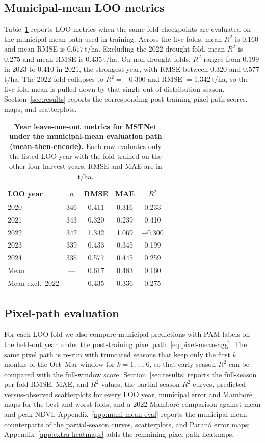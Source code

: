 \subsection{Municipal-mean LOO metrics}
\label{sec:exp-muni-mean}
Table~\ref{tab:loo-muni-mean} reports LOO metrics when the same fold checkpoints are evaluated on the municipal-mean path used in training.
Across the five folds, mean $R^2$ is $0.160$ and mean RMSE is $0.617$\,\si{t/ha}.
Excluding the 2022 drought fold, mean $R^2$ is $0.275$ and mean RMSE is $0.435$\,\si{t/ha}.
On non-drought folds, $R^2$ ranges from $0.199$ in 2023 to $0.410$ in 2021, the strongest year, with RMSE between $0.320$ and $0.577$\,\si{t/ha}.
The 2022 fold collapses to $R^2=-0.300$ and RMSE $=1.342$\,\si{t/ha}, so the five-fold mean is pulled down by that single out-of-distribution season.
Section~\ref{sec:results} reports the corresponding post-training pixel-path scores, maps, and scatterplots.

\begin{table}[!htbp]
\centering
\caption{\textbf{Year leave-one-out metrics for MSTNet under the municipal-mean evaluation path (mean-then-encode).}
Each row evaluates only the listed LOO year with the fold trained on the other four harvest years.
RMSE and MAE are in \si{t/ha}.}
\label{tab:loo-muni-mean}
\begin{tabular}{lcccc}
\toprule
LOO year & $n$ & RMSE & MAE & $R^2$ \\
\midrule
2020 & 346 & 0.411 & 0.316 & 0.233 \\
2021 & 343 & 0.320 & 0.239 & 0.410 \\
2022 & 342 & 1.342 & 1.069 & $-0.300$ \\
2023 & 339 & 0.433 & 0.345 & 0.199 \\
2024 & 336 & 0.577 & 0.445 & 0.259 \\
\midrule
Mean & --- & 0.617 & 0.483 & 0.160 \\
Mean excl.\ 2022 & --- & 0.435 & 0.336 & 0.275 \\
\bottomrule
\end{tabular}
\end{table}

\subsection{Pixel-path evaluation}
For each LOO fold we also compare municipal predictions with PAM labels on the held-out year under the post-training pixel path~\eqref{eq:pixel-mean-agg}.
The same pixel path is re-run with truncated seasons that keep only the first $k$ months of the Oct--Mar window for $k=1,\ldots,6$, so that early-season $R^2$ can be compared with the full-window score.
Section~\ref{sec:results} reports the full-season per-fold RMSE, MAE, and $R^2$ values, the partial-season $R^2$ curves, predicted-versus-observed scatterplots for every LOO year, municipal error and Mambor\'{e} maps for the best and worst folds, and a 2022 Mambor\'{e} comparison against mean and peak NDVI.
Appendix~\ref{app:muni-mean-eval} reports the municipal-mean counterparts of the partial-season curves, scatterplots, and Paraná error maps; Appendix~\ref{app:extra-heatmaps} adds the remaining pixel-path heatmaps.

